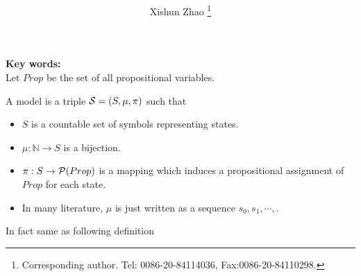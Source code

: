 \documentclass[12pt]{article}
\begin{document}
\begin{CJK*}{GBK}{song}
\CJKtilde




\title{
}

\author{
Xishun Zhao \footnote{Corresponding author. Tel: 0086-20-84114036,
Fax:0086-20-84110298.}
}





\maketitle

\begin{abstract}

\end{abstract}





{\bf Key words:} \\

Let $Prop$ be the set of all propositional variables.
\vskip 2mm

A model
is a triple
${\cal S}=(S,\mu,\pi)$ such that
\begin{itemize}
\item $S$ is a countable set of symbols representing states.
\item $\mu: \mathbb{N}\rightarrow S$ is a bijection.
\item $\pi: S\rightarrow {\cal P}(Prop)$ is a mapping which induces a propositional assignment of $Prop$ for each state.
\item In many literature, $\mu$ is just written as a sequence $s_0,s_1,\cdots,$.
\end{itemize}


In fact same as following definition\\


\end{CJK*}
\end{document}
